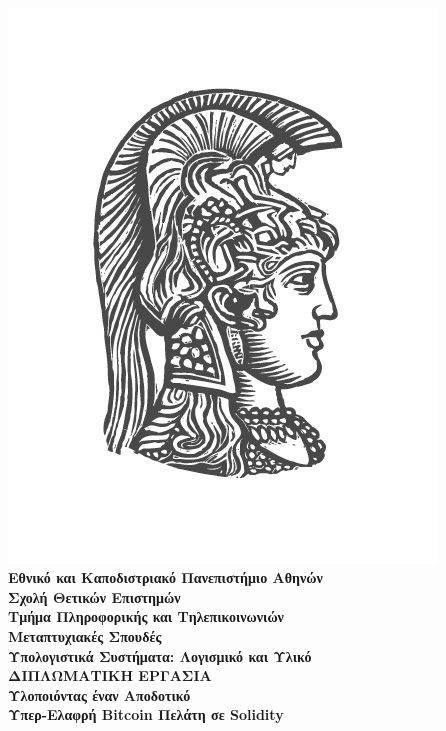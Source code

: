 \
\vspace{1.5cm}

\begin{center}
    {\includegraphics[scale=0.7]{figures/logo_uoa.jpg}}\\
    {\Large \textbf{Εθνικό και Καποδιστριακό Πανεπιστήμιο Αθηνών}} \\
    {\large \textbf{Σχολή Θετικών Επιστημών}} \\
    {\large \textbf{Τμήμα Πληροφορικής και Τηλεπικοινωνιών}}\\
    \vspace{1cm}
    {\large \textbf{Μεταπτυχιακές Σπουδές}} \\
    {\large \textbf{Υπολογιστικά Συστήματα: Λογισμικό και Υλικό}}\\
    \vspace{5mm}
    {\textbf{ΔΙΠΛΩΜΑΤΙΚΗ ΕΡΓΑΣΙΑ}}\\
    \vspace{0.8cm}
    {\textbf{\Large Υλοποιόντας έναν Αποδοτικό\\ Υπερ-Ελαφρή Bitcoin Πελάτη σε Solidity}}\\
    \vspace{1.5cm}



\end{center}
